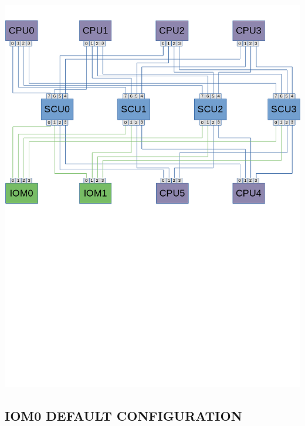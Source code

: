 \noindent\includegraphics[width=\textwidth,height=\textheight,keepaspectratio]{DefaultCablingDiagram-cpu.png}

\subsection[IOM0 Default Configuration]{IOM0 DEFAULT CONFIGURATION}

